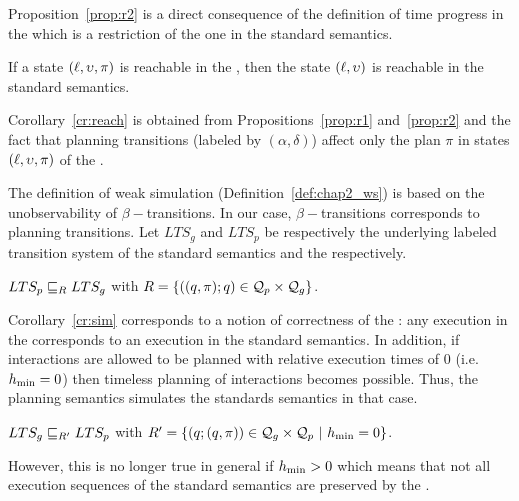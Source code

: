 Proposition~\ref{prop:r2} is a direct consequence of the definition of time progress in 
the \lps which is a restriction of the one in the standard semantics.

\begin{corollary}\label{cr:reach}
If a state $(\ell,\upsilon,\pi)$ is reachable in the \lpsb, then the state $(\ell,\upsilon)$ is 
  reachable in the standard semantics.
\end{corollary}

Corollary~\ref{cr:reach} is obtained from Propositions~\ref{prop:r1} and~\ref{prop:r2} and the 
fact that planning transitions (labeled by $(\alpha,\delta)$) affect only the plan $\pi$ in 
states $(\ell,\upsilon,\pi)$ of the \lpsabr.

The definition of weak simulation (Definition~\ref{def:chap2_ws})
is based on the unobservability of $\beta-$transitions. 
In our case, $\beta-$transitions corresponds to planning transitions.
Let $LTS_g$ and $LTS_p$ be respectively the underlying labeled transition system of the standard
semantics and the \lps respectively.
\begin{corollary}\label{cr:sim}
  $LTS_p\sqsubseteq_{R} LTS_g$ with $R=\{((q,\pi);q)\in\mathcal{Q}_p\times\mathcal{Q}_g\}$.
\end{corollary}

Corollary~\ref{cr:sim} corresponds to a notion of correctness of the \lpsb: any execution in 
the \lpsabrb corresponds to an execution in the standard semantics.
In addition, if interactions are allowed to be planned with relative execution times of $0$ 
(i.e. $h_{\min} = 0$) then timeless planning of interactions becomes possible. Thus, the planning 
semantics simulates the standards semantics in that case.
\begin{corollary}
  $LTS_g\sqsubseteq_{R'} LTS_p$ with $R'=\{(\q;(\q,\pi))\in\Q_g\times\Q_p\ | \ \hmin=0\}$.
\end{corollary}

However, this is no longer true in general if  $h_{\min} > 0$ which means that not all execution 
sequences of the standard semantics are preserved by the \lpsb.

